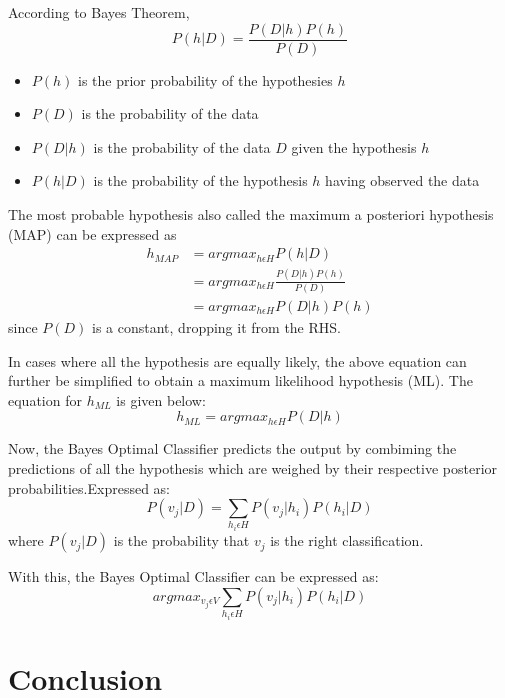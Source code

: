 \documentclass{acmtog} %
\begin{document}
According to Bayes Theorem,
\begin{equation}
	P(h|D) = \frac{P(D|h)P(h)}{P(D)}
	\label{eq:bayesEq}
\end{equation}
\begin{itemize}
	\item $P(h)$ is the prior probability of the hypothesies $h$
	\item $P(D)$ is the probability of the data
	\item $P(D|h)$ is the probability of the data $D$ given the hypothesis $h$
	\item $P(h|D)$ is the probability of the hypothesis $h$ having observed the data
\end{itemize}

The most probable hypothesis also called the maximum a posteriori hypothesis (MAP) can be expressed as
\begin{equation}
	\begin{split}
		h_{MAP} & = argmax_{h \epsilon H} P(h|D) \\
		& = argmax_{h \epsilon H} \frac{P(D|h)P(h)}{P(D)} \\
		& = argmax_{h \epsilon H} P(D|h)P(h)
		\label{eq:mapEq}
	\end{split}
\end{equation}
since $P(D)$ is a constant, dropping it from the RHS.

In cases where all the hypothesis are equally likely, the above equation can further be simplified to obtain a maximum likelihood hypothesis (ML). The equation for $h_{ML}$ is given below:
\begin{equation}
	h_{ML} = argmax_{h \epsilon H} P(D|h)
	\label{eq:mlEq}
\end{equation}

Now, the Bayes Optimal Classifier predicts the output by combiming the predictions of all the hypothesis which are weighed by their respective posterior probabilities.Expressed as:
\begin{equation}
	P(v_j|D) = \sum _{h_i \epsilon H} P(v_j|h_i) P(h_i|D)
	\label{eq:bocEq1}
\end{equation}
where $P(v_j|D)$ is the probability that $v_j$ is the right classification.

With this, the Bayes Optimal Classifier can be expressed as:
\begin{equation}
	argmax_{v_j \epsilon V} \sum _{h_i \epsilon H} P(v_j|h_i) P(h_i|D)
	\label{eq:bocEq2}
\end{equation}
\section{Conclusion}
\end{document}
